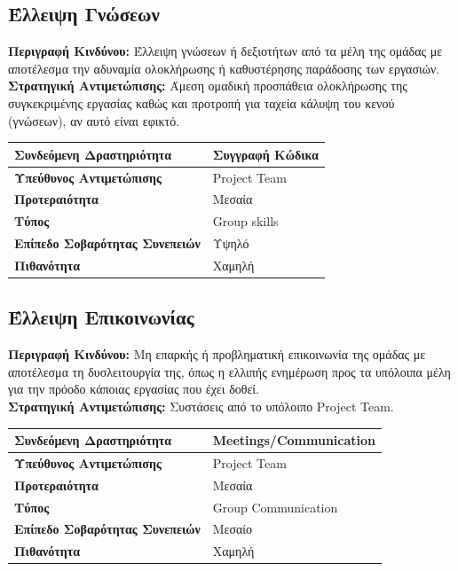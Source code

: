 \documentclass{article}
\newcommand\T{\rule{0pt}{2.6ex}}       %
\newcommand\B{\rule[-1.2ex]{0pt}{0pt}}
\begin{document}
 \newpage
 
 \subsection{Έλλειψη Γνώσεων}
 
\textbf{Περιγραφή Κινδύνου:}  Έλλειψη γνώσεων ή δεξιοτήτων από τα μέλη της ομάδας με αποτέλεσμα την αδυναμία ολοκλήρωσης ή καθυστέρησης παράδοσης των εργασιών.\\

\textbf{Στρατηγική Αντιμετώπισης:} Άμεση ομαδική προσπάθεια ολοκλήρωσης της συγκεκριμένης εργασίας καθώς και προτροπή για ταχεία κάλυψη του κενού (γνώσεων), αν αυτό είναι εφικτό.
  
   \begin{center}
     \begin{tabular}{|l|l|}
     \hline
      \textbf{Συνδεόμενη Δραστηριότητα}  & Συγγραφή Κώδικα \T\B \\ 
      \hline
      \textbf{Υπεύθυνος Αντιμετώπισης} & Project Team \T\B \\
      \hline
      \textbf{Προτεραιότητα} & Μεσαία \T\B \\
      \hline
      \textbf{Τύπος} & Group skills\T\B \\
      \hline
      \textbf{Επίπεδο Σοβαρότητας Συνεπειών} & Υψηλό \T\B \\
      \hline
      \textbf{Πιθανότητα} & Χαμηλή \T\B \\
      \hline
     \end{tabular}
 \end{center}
 
 
 \subsection{Έλλειψη Επικοινωνίας}
 
\textbf{Περιγραφή Κινδύνου:} Μη επαρκής ή προβληματική επικοινωνία της ομάδας με αποτέλεσμα τη δυσλειτουργία της, όπως η ελλιπής ενημέρωση προς τα υπόλοιπα μέλη για την πρόοδο κάποιας εργασίας που έχει δοθεί.\\
 
\textbf{Στρατηγική Αντιμετώπισης:} Συστάσεις από το υπόλοιπο Project Team.
 
  \begin{center}
     \begin{tabular}{|l|l|}
     \hline
      \textbf{Συνδεόμενη Δραστηριότητα} & Meetings/Communication \T\B \\ 
      \hline
      \textbf{Υπεύθυνος Αντιμετώπισης} & Project Team \T\B \\
      \hline
      \textbf{Προτεραιότητα} & Μεσαία \T\B \\
      \hline
      \textbf{Τύπος} & Group Communication \T\B \\
      \hline
      \textbf{Επίπεδο Σοβαρότητας Συνεπειών} & Μεσαίο \T\B \\
      \hline
      \textbf{Πιθανότητα} & Χαμηλή \T\B \\
      \hline
     \end{tabular}
 \end{center}
\end{document}
